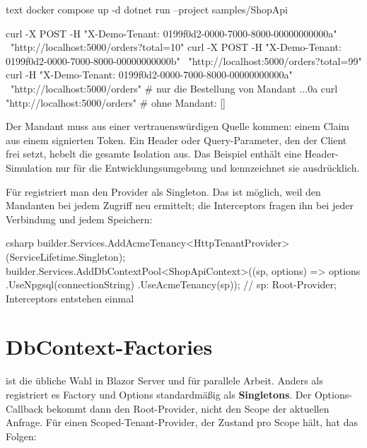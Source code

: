 \begin{sourcecode}[Shell]{text}
docker compose up -d
dotnet run --project samples/ShopApi

curl -X POST -H "X-Demo-Tenant: 0199f0d2-0000-7000-8000-00000000000a" \
    "http://localhost:5000/orders?total=10"
curl -X POST -H "X-Demo-Tenant: 0199f0d2-0000-7000-8000-00000000000b" \
    "http://localhost:5000/orders?total=99"
curl -H "X-Demo-Tenant: 0199f0d2-0000-7000-8000-00000000000a" \
    "http://localhost:5000/orders"        # nur die Bestellung von Mandant ...0a
curl "http://localhost:5000/orders"       # ohne Mandant: []
\end{sourcecode}

\begin{important}
  Der Mandant muss aus einer vertrauenswürdigen Quelle kommen: einem Claim aus einem
  signierten Token. Ein Header oder Query-Parameter, den der Client frei setzt, hebelt die
  gesamte Isolation aus. Das Beispiel enthält eine Header-Simulation nur für die
  Entwicklungsumgebung und kennzeichnet sie ausdrücklich.
\end{important}

Für  registriert man den
Provider als Singleton. Das ist möglich, weil
 den Mandanten bei jedem Zugriff neu
ermittelt; die Interceptors fragen ihn bei jeder Verbindung und jedem Speichern:

\begin{sourcecode}[Variante mit Pooling]{csharp}
builder.Services.AddAcmeTenancy<HttpTenantProvider>(ServiceLifetime.Singleton);
builder.Services.AddDbContextPool<ShopApiContext>((sp, options) => options
    .UseNpgsql(connectionString)
    .UseAcmeTenancy(sp));   // sp: Root-Provider; Interceptors entstehen einmal
\end{sourcecode}

\section{DbContext-Factories}

 ist die übliche Wahl in
Blazor Server und für parallele Arbeit. Anders als
 registriert es Factory und Options
standardmäßig als \textbf{Singletons}. Der Options-Callback bekommt dann den Root-Provider,
nicht den Scope der aktuellen Anfrage. Für einen Scoped-Tenant-Provider, der Zustand pro
Scope hält, hat das Folgen:

